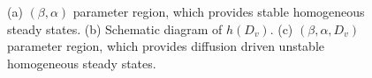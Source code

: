 \begin{figure}[!!!h!!!tbp]
\centering
{}
\caption{(a) $(\beta,\alpha)$ parameter region, which provides stable homogeneous steady states. (b) Schematic diagram of $h(D_v)$. (c) $(\beta,\alpha,D_v)$ parameter region, which provides diffusion driven unstable homogeneous steady states. \label{DDI_figs}}
\end{figure}
